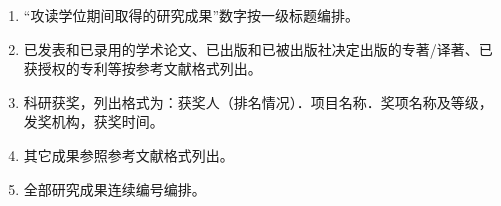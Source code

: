 \begin{publications}

\begin{enumerate}
  \item “攻读学位期间取得的研究成果”数字按一级标题编排。
  \item 已发表和已录用的学术论文、已出版和已被出版社决定出版的专著/译著、已获授权的专利等按参考文献格式列出。
  \item 科研获奖，列出格式为：获奖人（排名情况）．项目名称．奖项名称及等级，发奖机构，获奖时间。
  \item 其它成果参照参考文献格式列出。
  \item 全部研究成果连续编号编排。
\end{enumerate}

\end{publications}
